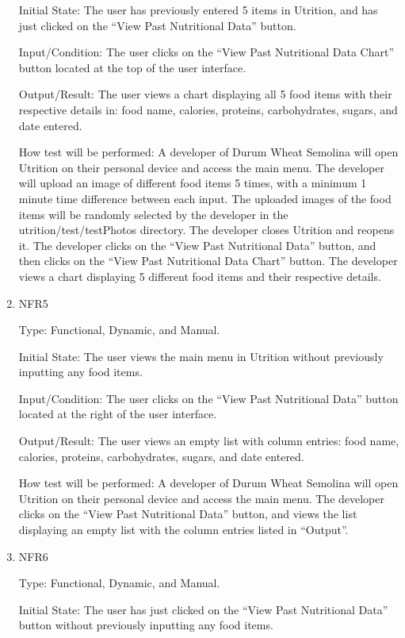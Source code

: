 \documentclass[12pt, titlepage]{article}
\begin{document}
\begin{enumerate}
Initial State: The user has previously entered 5 items in Utrition, and has just clicked on the “View Past Nutritional Data” button.

Input/Condition: The user clicks on the “View Past Nutritional Data Chart” button located at the top of the user interface.

Output/Result: The user views a chart displaying all 5 food items with their respective details in: food name, calories, proteins, carbohydrates, sugars, and date entered.

How test will be performed: A developer of Durum Wheat Semolina will open Utrition on their personal device and access the main menu. The developer will upload an image of different food items 5 times, with a minimum 1 minute time difference between each input. The uploaded images of the food items will be randomly selected by the developer in the utrition/test/testPhotos directory. The developer closes Utrition and reopens it. The developer clicks on the “View Past Nutritional Data” button, and then clicks on the “View Past Nutritional Data Chart” button. The developer views a chart displaying 5 different food items and their respective details.

\item{NFR5\\}

Type: Functional, Dynamic, and Manual.

Initial State: The user views the main menu in Utrition without previously inputting any food items.

Input/Condition: The user clicks on the “View Past Nutritional Data” button located at the right of the user interface.

Output/Result: The user views an empty list with column entries: food name, calories, proteins, carbohydrates, sugars, and date entered.

How test will be performed: A developer of Durum Wheat Semolina will open Utrition on their personal device and access the main menu. The developer clicks on the “View Past Nutritional Data” button, and views the list displaying an empty list with the column entries listed in “Output”.

\item{NFR6\\}

Type: Functional, Dynamic, and Manual.

Initial State: The user has just clicked on the “View Past Nutritional Data” button without previously inputting any food items.


\end{enumerate}
\end{document}
